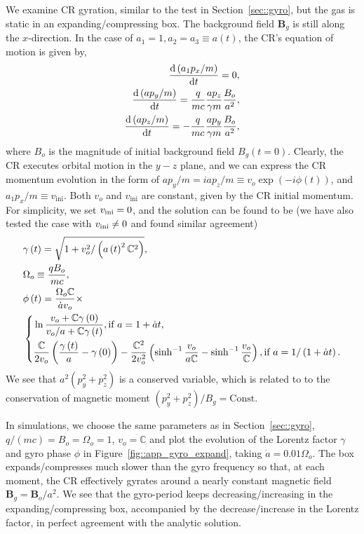 \documentclass[fleqn,usenatbib]{mnras}
\begin{document}
We examine CR gyration, similar to the test in Section~\ref{sec::gyro}, but the gas is static in an expanding/compressing box. The background field $\boldsymbol{B}_g$ is still along the $x$-direction. In the case of $a_1 = 1, a_2=a_3\equiv a(t)$, the CR's equation of motion is given by,
\begin{align}
	\frac{\dd \left(a_1 p_x/m\right)}{\dd t} = 0, \notag \\
	\frac{\dd \left(a p_y/m\right)}{\dd t} = \frac{q}{mc} \frac{a p_z}{\gamma m} \frac{B_o}{a^2}, \notag \\
	\frac{\dd \left(a p_z/m\right)}{\dd t} = -\frac{q}{mc} \frac{a p_y}{\gamma m} \frac{B_o}{a^2},
\end{align}
where $B_o$ is the magnitude of initial background field $B_g\left(t=0\right)$. Clearly, the CR executes orbital motion in the $y-z$ plane, and we can express the CR momentum evolution in the form of $a p_y/m = i a p_z/m \equiv v_o \exp\left(-i \phi\left(t\right)\right)$, and $a_1 p_x / m \equiv v_\text{ini}$. Both $v_o$ and $v_\text{ini}$ are constant, given by the CR initial momentum.
For simplicity, we set $v_{\rm ini} = 0$, and the solution can be found to be (we have also tested the case with $v_{\rm ini}\neq0$ and found similar agreement)
\begin{align}
	&\gamma \left(t\right) = \sqrt{1+  v_{o}^2 / \left(  a\left(t\right)^2 \mathbb{C}^2 \right) }, \notag \\
	&\Omega_o \equiv \frac{qB_o}{mc},\notag  \\
	&\phi\left(t\right) = \frac{\Omega_o \mathbb{C}}{\dot{a}v_o} \times \notag \\ &\left\{
\begin{aligned}
& \ln \frac{v_o + \mathbb{C} \gamma\left(0\right)}{v_o/a  + \mathbb{C} \gamma\left(t\right)}, \text{if } a=1+\dot{a}t,\\
&  \frac{\mathbb{C}}{2 v_o} \left(\frac{\gamma\left(t\right)}{a} - \gamma\left(0\right)\right) - \frac{\mathbb{C}^2 }{2 v_o^2} \left(\sinh^{-1}\frac{v_o}{a\mathbb{C}} - \sinh^{-1}\frac{v_o}{\mathbb{C}} \right), \text{if } a=1/\left(1+\dot{a}t\right).
\end{aligned}
\right. \label{equ::app_pic_expand}
\end{align}
We see that $a^2 \left(p_y^2 + p_z^2\right)$ is a conserved variable, which is related to to the conservation of magnetic moment $\left(p_y^2 + p_z^2\right)/B_g = \text{Const}$.

In simulations, we choose the same parameters as in Section~\ref{sec::gyro}, $q/\left(mc\right)=B_o=\Omega_o=1$, $v_o = \mathbb{C}$ and plot the evolution of the Lorentz factor $\gamma$ and gyro phase $\phi$ in Figure~\ref{fig::app_gyro_expand}, taking $\dot{a}=0.01 \Omega_o$. The box expands/compresses much slower than the gyro frequency so that, at each moment, the CR effectively gyrates around a nearly constant magnetic field $\boldsymbol{B}_g=\boldsymbol{B}_o/a^2$.
We see that the gyro-period keeps decreasing/increasing in the expanding/compressing box, accompanied by the decrease/increase in the Lorentz factor, in perfect agreement with the analytic solution.




\bsp	%
\label{lastpage}
\end{document}
